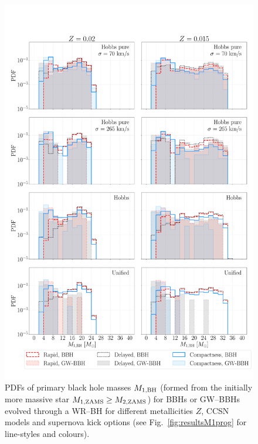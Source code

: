 \documentclass[a4paper,titlepage]{book}     	%
\begin{document}
\begin{figure}[h]
	\centering
	\includegraphics[width=\textwidth]{./images/remM1.pdf}	
	\caption{PDFs of primary black hole masses $M_{\rm 1,BH}$ (formed from the initially more massive star $M_{\rm 1,ZAMS} \geq M_{\rm 2,ZAMS}$) for BBHs or GW--BBHs evolved through a WR--BH for different metallicities $Z$, CCSN models and supernova kick options (see Fig.\ \ref{fig:resultsM1prog} for line-styles and colours).}\label{fig:resultsMBH1rem}
\end{figure}
\end{document}
